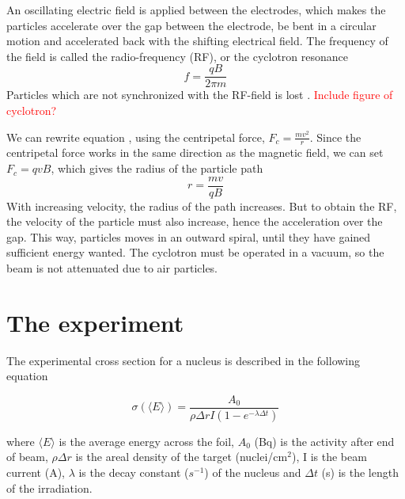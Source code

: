 \documentclass[a4paper,11pt,twoside]{book}
\begin{document}
An oscillating electric field is applied between the electrodes, which makes the particles accelerate over the gap between the electrode, be bent in a circular motion and accelerated back with the shifting electrical field. The frequency of the field is called the radio-frequency (RF), or the cyclotron resonance
\begin{equation}
    f = \frac{qB}{2\pi m}
\end{equation}
Particles which are not synchronized with the RF-field is lost \cite{KireeffCovo2018}. \textcolor{red}{Include figure of cyclotron?}  

We can rewrite equation \label{eq:Lorentz}, using the centripetal force, $F_c = \frac{mv^2}{r}$. Since the centripetal force works in the same direction as the magnetic field, we can set $F_c=qvB$, which gives the radius of the particle path 
\begin{equation}
    r = \frac{mv}{qB}
\end{equation}
With increasing velocity, the radius of the path increases. But to obtain the RF, the velocity of the particle must also increase, hence the acceleration over the gap. This way, particles moves in an outward spiral, until they have gained sufficient energy wanted. The cyclotron must be operated in a vacuum, so the beam is not attenuated due to air particles. 




\section{The experiment}



The experimental cross section for a nucleus is described in the following equation

\begin{equation} \label{eq:CrossSection_general}
    \sigma(\langle E \rangle) = \frac{A_0}{\rho\Delta r I (1-e^{-\lambda \Delta t})}
\end{equation}



where $\langle E \rangle$ is the average energy across the foil, $A_0$ (Bq) is the activity after end of beam, $\rho \Delta r$ is the areal density of the target (nuclei/cm$^2$), I is the beam current (A), $\lambda$ is the decay constant ($s^{-1}$) of the nucleus and $\Delta t$ (s) is the length of the irradiation. %
\end{document}
